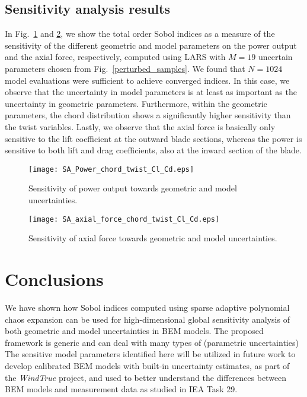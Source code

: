 \subsection{Sensitivity analysis results}
In Fig.~\ref{fig:sensitivity_analysis_power} and \ref{fig:sensitivity_analysis_force}, we show the total order Sobol indices as a measure of the sensitivity of the different geometric and model parameters on the power output and the axial force, respectively, computed using LARS with $M=19$ uncertain parameters chosen from Fig.~\ref{perturbed_samples}. We found that $N=1024$ model evaluations were sufficient to achieve converged indices. In this case, we observe that the uncertainty in model parameters is at least as important as the uncertainty in geometric parameters. Furthermore, within the geometric parameters, the chord distribution shows a significantly higher sensitivity than the twist variables. Lastly, we observe that the axial force is basically only sensitive to the lift coefficient at the outward blade sections, whereas the power is sensitive to both lift and drag coefficients, also at the inward section of the blade.

\begin{figure}[h!]
\centering
\texttt{[image: SA\_Power\_chord\_twist\_Cl\_Cd.eps]}
\caption{Sensitivity of power output towards geometric and model uncertainties.}
\label{fig:sensitivity_analysis_power}
\end{figure}


\begin{figure}[h!]
\centering
\texttt{[image: SA\_axial\_force\_chord\_twist\_Cl\_Cd.eps]}
\caption{Sensitivity of axial force towards geometric and model uncertainties.}
\label{fig:sensitivity_analysis_force}
\end{figure}

\section{Conclusions}\label{sec:conclusions}
We have shown how Sobol indices computed using sparse adaptive polynomial chaos expansion can be used for high-dimensional global sensitivity analysis of both geometric and model uncertainties in BEM models. The proposed framework is generic and can deal with many types of (parametric uncertainties) The sensitive model parameters identified here will be utilized in future work to develop calibrated BEM models with built-in uncertainty estimates, as part of the \textit{WindTrue} project, and used to better understand the differences between BEM models and measurement data as studied in IEA Task 29.